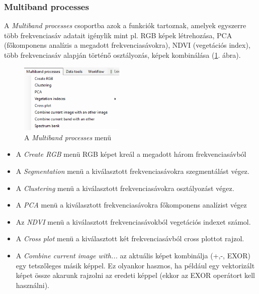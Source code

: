 \documentclass[a4paper,12pt]{article}
\begin{document}
\subsubsection{Multiband processes}

A\textit{ Multiband processes} csoportba azok a funkciók tartoznak, amelyek egyszerre több frekvenciasáv adatait igénylik mint pl. RGB képek létrehozása, PCA (főkomponens analízis a megadott frekvenciasávokra), NDVI (vegetációs index), több frekvenciasáv alapján történő osztályozás, képek kombinálása (\ref{fig:multiband_menu}. ábra). 


\begin{figure}
	\centering
	\includegraphics[width=5cm]{multiband_menu.png}
	\caption{A \textit{Multiband processes} menü}
	\label{fig:multiband_menu}
\end{figure}


\begin{itemize}
	
	\item A \textit{Create RGB} menü RGB képet kreál a megadott három frekvenciasávból
	
	\item A \textit{Segmentation} menü a kiválasztott frekvenciasávokra szegmentálást végez.
	
	\item A \textit{Clustering} menü a kiválasztott frekvenciasávokra osztályozást végez.
	
	\item A \textit{PCA} menü a kiválasztott frekvenciasávokra főkomponens analízist végez
	
	\item Az \textit{NDVI} menü a kiválasztott frekvenciasávokból vegetációs indexet számol.
	
	\item A \textit{Cross plot} menü a kiválasztott két frekvenciasávból cross plottot rajzol.
	
	\item A \textit{Combine current image with...} az aktuális képet kombinálja (+,-, EXOR) egy tetszőleges másik képpel. Ez olyankor hasznos, ha például egy vektorizált képet össze akarunk rajzolni az eredeti képpel (ekkor az EXOR operátort kell használni).
	
	
\end{itemize}
\end{document}
